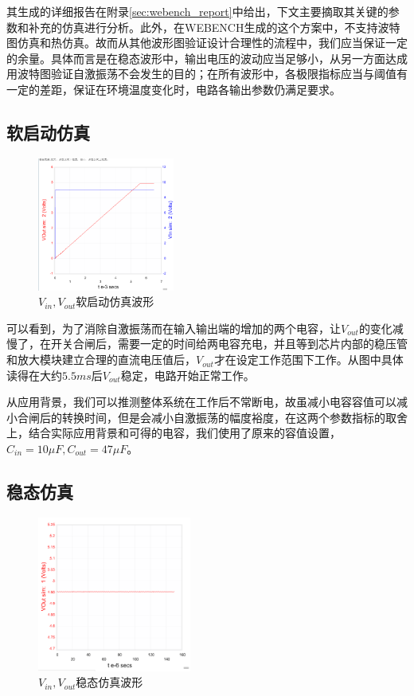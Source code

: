 \documentclass[a4paper, 11pt]{article} %
\begin{document}
其生成的详细报告在附录\ref{sec:webench_report}中给出，下文主要摘取其关键的参数和补充的仿真进行分析。此外，在WEBENCH生成的这个方案中，不支持波特图仿真和热仿真。故而从其他波形图验证设计合理性的流程中，我们应当保证一定的余量。具体而言是在稳态波形中，输出电压的波动应当足够小，从另一方面达成用波特图验证自激振荡不会发生的目的；在所有波形中，各极限指标应当与阈值有一定的差距，保证在环境温度变化时，电路各输出参数仍满足要求。

\subsection{软启动仿真}

\begin{figure}[H]
    \centering
    \includegraphics[width = 0.4\textwidth]{startup_sim.png}
    \caption{$V_{in}, V_{out}$软启动仿真波形}
\end{figure}

可以看到，为了消除自激振荡而在输入输出端的增加的两个电容，让$V_{out}$的变化减慢了，在开关合闸后，需要一定的时间给两电容充电，并且等到芯片内部的稳压管和放大模块建立合理的直流电压值后，$V_{out}$才在设定工作范围下工作。从图中具体读得在大约$5.5ms$后$V_{out}$稳定，电路开始正常工作。

从应用背景，我们可以推测整体系统在工作后不常断电，故虽减小电容容值可以减小合闸后的转换时间，但是会减小自激振荡的幅度裕度，在这两个参数指标的取舍上，结合实际应用背景和可得的电容，我们使用了原来的容值设置，$C_{in} = 10\mu F, C_{out} = 47\mu F$。

\subsection{稳态仿真}

\begin{figure}[H]
    \centering
    \includegraphics[width = 0.45\textwidth]{steady_state_sim.png}
    \caption{$V_{in}, V_{out}$稳态仿真波形}
\end{figure}
\end{document}
